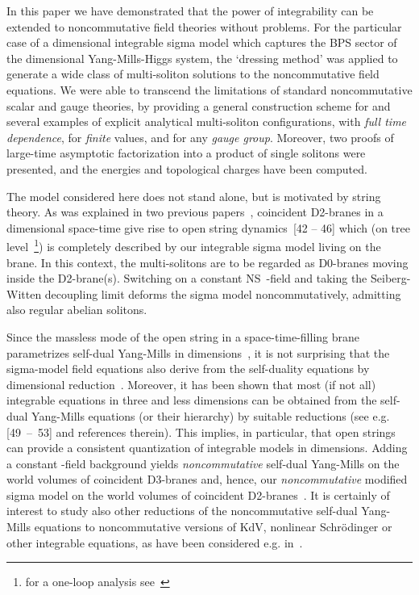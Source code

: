 \documentclass[a4paper,11pt]{article}
\numberwithin{equation}{section}
\def\th{\theta}
\begin{document}
\noindent
In this paper we have demonstrated that the power of integrability can
be extended to noncommutative field theories without problems.
For the particular case of a \coordHE{} dimensional integrable sigma model
which captures the BPS sector of the \coordHE{} dimensional Yang-Mills-Higgs
system, the `dressing method' was applied to generate a wide class
of multi-soliton solutions to the noncommutative field equations.
We were able to transcend the limitations of standard noncommutative
scalar and gauge theories, by providing a general construction scheme for
and several examples of explicit analytical multi-soliton configurations,
with {\it full time dependence\/}, for {\it finite\/} \myHighlight{$\th$}\coordHE{} values, and
for any \coordHE{} {\it gauge group\/}. Moreover, two proofs of large-time
asymptotic factorization into a product of single solitons were presented,
and the energies and topological charges have been computed.

The model considered here does not stand alone, but is motivated
by string theory. As was explained in two previous papers~\cite{LPS1,LPS2},
\coordHE{} coincident D2-branes in a \coordHE{} dimensional space-time give rise to
open \coordHE{} string dynamics~[42 -- 46] which (on tree level~\footnote{
for a one-loop analysis see~\cite{CLN,CS} }) is completely described
by our integrable \coordHE{} sigma model living on the brane. In this context, the
multi-solitons are to be regarded as D0-branes moving inside the D2-brane(s).
Switching on a constant NS~\coordHE{}-field and taking the Seiberg-Witten decoupling
limit deforms the sigma model noncommutatively, admitting also regular
abelian solitons.

Since the massless mode of the open \coordHE{} string in a space-time-filling
brane parametrizes self-dual Yang-Mills in \coordHE{} dimensions~\cite{OV},
it is not surprising that the sigma-model field equations also derive from the
self-duality equations by dimensional reduction~\cite{ward}.
Moreover, it has been shown that most (if not all) integrable equations in
three and less dimensions can be obtained from the self-dual Yang-Mills
equations (or their hierarchy) by suitable reductions
(see e.g. \mbox{[49 -- 53]} and references therein).
This implies, in particular, that open \coordHE{} strings can provide a
consistent quantization of integrable models in \coordHE{} dimensions.
Adding a constant \coordHE{}-field background yields {\it noncommutative\/} self-dual
Yang-Mills on the world volumes of coincident D3-branes and, hence,
our {\it noncommutative\/} modified sigma model on the world volumes of
coincident D2-branes~\cite{LPS1}.
It is certainly of interest to study also other reductions of the
noncommutative self-dual Yang-Mills equations to noncommutative versions of
KdV, nonlinear Schr\"odinger or other integrable equations, as have been
considered e.g. in~\cite{taka,legare,dimakis,paniak}.
\end{document}
